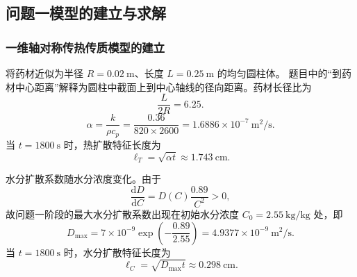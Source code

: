 \documentclass[12pt,a4paper]{article}
\newcommand{\ph}[1]{\textbf{【#1】}}                                   %
\newcommand{\figph}[1]{%
  \begin{center}
  \fbox{\parbox{0.88\textwidth}{\centering\vspace{2ex}#1\vspace{2ex}}}
  \end{center}}
\begin{document}
%
%

\subsection{问题一模型的建立与求解}

\subsubsection{一维轴对称传热传质模型的建立}

将药材近似为半径 $R=0.02\ \mathrm{m}$、长度 $L=0.25\ \mathrm{m}$ 的均匀圆柱体。
题目中的“到药材中心距离”解释为圆柱中截面上到中心轴线的径向距离。药材长径比为
\begin{equation}
\frac{L}{2R}=6.25.
\end{equation}
\begin{equation}
\alpha=\frac{k}{\rho c_p}
=\frac{0.36}{820\times2600}
=1.6886\times10^{-7}\ \mathrm{m^2/s}.
\end{equation}
当 $t=1800\ \mathrm{s}$ 时，热扩散特征长度为
\begin{equation}
\ell_T=\sqrt{\alpha t}\approx1.743\ \mathrm{cm}.
\end{equation}

水分扩散系数随水分浓度变化。由于
\begin{equation}
\frac{\mathrm{d}D}{\mathrm{d}C}
=
D(C)\frac{0.89}{C^2}>0,
\end{equation}
故问题一阶段的最大水分扩散系数出现在初始水分浓度
$C_0=2.55\ \mathrm{kg/kg}$ 处，即
\begin{equation}
D_{\max}
=
7\times10^{-9}
\exp\left(-\frac{0.89}{2.55}\right)
=
4.9377\times10^{-9}\ \mathrm{m^2/s}.
\end{equation}
当 $t=1800\ \mathrm{s}$ 时，水分扩散特征长度为
\begin{equation}
\ell_C=\sqrt{D_{\max}t}\approx0.298\ \mathrm{cm}.
\end{equation}
\end{document}
